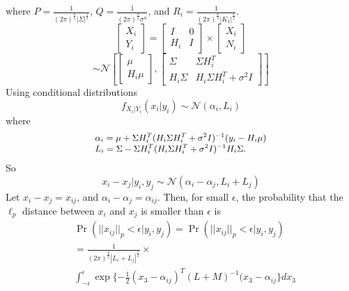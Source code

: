 \documentclass{article}
\begin{document}
where $P=\frac{1}{({2\pi})^{\frac{d}{2}}{|\Sigma|}^{\frac{1}{2}}}$, $Q=\frac{1}{({2\pi})^{\frac{d}{2}}\sigma^n}$, and $R_i=\frac{1}{({2\pi})^{\frac{d}{2}} {|K_1|}^{\frac{1}{2}}}$.
\begin{equation}
 \left[\begin{array}{c} X_i \\ Y_i \end{array}\right] = 
\begin{bmatrix} I & 0 \\ H_i & I \end{bmatrix} \times \left[ \begin{array}{c} X_i \\ N_i \end{array} \right]      
\end{equation}
\begin{equation}
 \sim \mathcal{N} \left[\begin{bmatrix} \mu \\ H_i \mu \end{bmatrix}, \begin{bmatrix} \Sigma & \Sigma H_i^T \\ H_i \Sigma & H_i \Sigma H_i^T + \sigma^2 I \end{bmatrix} \right]
\end{equation}
\noindent
Using conditional distributions
 \begin{equation}
  f_{X_i|Y_i}(x_i|y_i) \sim \mathcal{N}(\alpha_i, L_i)
 \end{equation}
where 
\begin{equation}
\small{
\begin{array}{l}\alpha_i = \mu + \Sigma H_i^T (H_i \Sigma H_i^T + \sigma^2 I)^{-1} (y_i - H_i \mu) \\ L_i = \Sigma - \Sigma H_i^T (H_i \Sigma H_i^T + \sigma^2 I)^{-1} H_i \Sigma .
       \end{array}}  
\end{equation}
So
\begin{equation}
x_i - x_j|y_i, y_j \sim \mathcal{N}(\alpha_i-\alpha_j, L_i+L_j)
\end{equation}
Let $x_i - x_j = x_{ij}$, and $\alpha_i -\alpha_j=\alpha_{ij}$. Then, for small $\epsilon$, the probability that the $\ell_p$ distance between $x_i$ and $x_j$ is smaller than $\epsilon$ is
\begin{align}
&\Pr(||x_{ij}||_{p} < \epsilon|y_i,y_j)   \nonumber
										 =	 \Pr(||x_{ij}||_{p} < \epsilon|y_i,y_j)\\ \nonumber
										&=   \frac{1}{(2 \pi)^{\frac{d}{2}} |L_{i}+L_{j}|^ \frac{1}{2}} \times \\ 
										& \int_{-\epsilon }^{\epsilon}\exp \{ -\frac{1}{2}(x_3 - \alpha_{ij})^T(L+M)^{-1}(x_3 - \alpha_{ij}\}dx_3 
\end{align}
\end{document}
